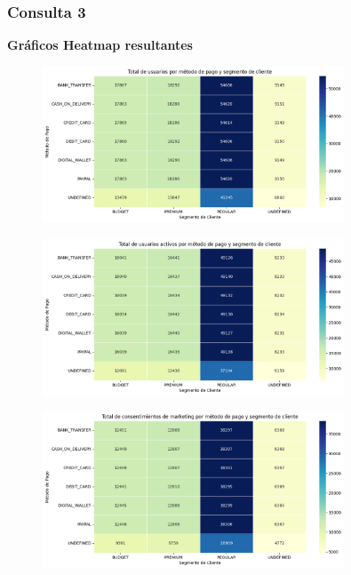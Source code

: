 \subsubsection{Consulta 3}
\textbf{Gráficos Heatmap resultantes}
\label{anexo:consulta3_heatmap}

\begin{figure}[H]
    \centering
    \includegraphics[width=0.8\textwidth]{imagenes/consulta3_heatmap1.png}
\end{figure}

\begin{figure}[H]
    \centering
    \includegraphics[width=0.8\textwidth]{imagenes/consulta3_heatmap2.png}
\end{figure}

\begin{figure}[H]
    \centering
    \includegraphics[width=0.8\textwidth]{imagenes/consulta3_heatmap3.png}
\end{figure}

